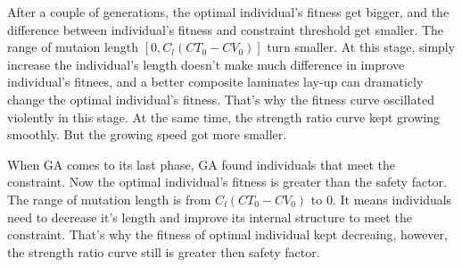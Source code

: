 \documentclass{article}
\begin{document}
After a couple of generations, the optimal individual's fitness get bigger, and the difference
between individual's fitness and constraint threshold get smaller. The range of mutaion length $[0,
C_l(CT_0 - CV_0)]$ turn smaller. At this stage, simply increase the individual's length doesn't make
much difference in improve individual's fitnees, and a better composite laminates lay-up can
dramaticly change the optimal individual's fitness. That's why the fitness curve oscillated
violently in this stage.  At the same time, the strength ratio curve kept growing smoothly. But the
growing speed got more smaller.

When GA comes to its last phase, GA found individuals that meet the constraint. Now the optimal
individual's fitness is greater than the safety factor. The range of mutation length is from 
$C_l(CT_0 - CV_0)$ to 0. It means individuals need to decrease it's length and improve its internal
structure to meet the constraint. That's why the fitness of optimal individual kept decreaing,
however, the strength ratio curve still is greater then safety factor.
\end{document}
